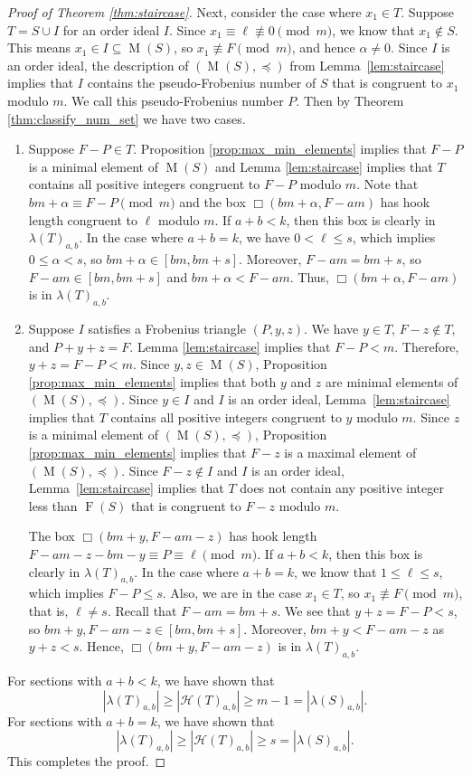 \documentclass{amsproc}
\DeclareMathOperator{\F}{F}
\DeclareMathOperator{\M}{M}
\theoremstyle{definition}
\theoremstyle{remark}
\numberwithin{equation}{section}
\begin{document}
\begin{proof}[Proof of Theorem \ref{thm:staircase}]
    Next, consider the case where $x_1\in T$. Suppose $T = S \cup I$ for an order ideal $I$. Since $x_1 \equiv \ell \not\equiv 0 \pmod{m}$, we know that $x_1\notin S$. This means
    $x_1\in I\subseteq \M(S)$, so $x_1\not\equiv F\pmod{m}$, and hence $\alpha\neq 0$.
    Since $I$ is an order ideal, the description of $(\M(S),\preccurlyeq)$ from Lemma~\ref {lem:staircase} implies that $I$ contains the pseudo-Frobenius number of $S$ that is congruent to $x_1$ modulo $m$. We call this pseudo-Frobenius number $P$.  Then by Theorem \ref{thm:classify_num_set} we have two cases.
        \begin{enumerate}[leftmargin=*]
            \item Suppose $F-P\in T$. Proposition \ref{prop:max_min_elements} implies that $F-P$ is a minimal element of $\M(S)$ and Lemma \ref{lem:staircase} implies that $T$ contains all positive integers congruent to $F-P$ modulo $m$. Note that $bm+\alpha\equiv F-P\pmod{m}$ and the box $\Box(bm+\alpha,F-am)$ has hook length congruent to $\ell$ modulo $m$. If $a+b<k$, then this box is clearly in $\lambda(T)_{a,b}$. In the case where $a+b=k$, we have $0<\ell \leq s$, which implies $0\leq \alpha< s$, so $bm+\alpha\in [bm,bm+s]$. Moreover, $F-am=bm+s$, so $F-am\in [bm,bm+s]$ and $bm+\alpha<F-am$. Thus, $\Box(bm+\alpha,F-am)$ is in $\lambda(T)_{a,b}$.
            
            \item Suppose $I$ satisfies a Frobenius triangle $(P,y,z)$. We have $y\in T$, $F-z\notin T$, and $P+y+z=F$. Lemma \ref{lem:staircase} implies that $F-P<m$. Therefore, $y+z=F-P <m$. Since $y,z\in \M(S)$, Proposition \ref{prop:max_min_elements} implies that both $y$ and $z$ are minimal elements of $(\M(S),\preccurlyeq)$. Since $y\in I$ and $I$ is an order ideal, Lemma~\ref{lem:staircase} implies that $T$ contains all positive integers congruent to $y$ modulo $m$. Since $z$ is a minimal element of $(\M(S),\preccurlyeq)$, Proposition \ref{prop:max_min_elements} implies that $F-z$ is a maximal element of $(\M(S),\preccurlyeq)$. Since $F-z\notin I$ and $I$ is an order ideal, Lemma~\ref{lem:staircase} implies that $T$ does not contain any positive integer less than $\F(S)$ that is congruent to $F-z$ modulo $m$.
            
            The box $\Box(bm+y,F-am-z)$ has hook length $F-am-z-bm-y\equiv P\equiv \ell \pmod{m}$.
            If $a+b<k$, then this box is clearly in $\lambda(T)_{a,b}$. In the case where $a+b=k$, we know that $1 \le \ell \le s$, which implies $F-P\leq s$. Also, we are in the case $x_1\in T$, so $x_1\not\equiv F\pmod{m}$, that is, $\ell \neq s$. Recall that $F-am=bm+s$. 
            We see that $y+z=F-P< s$, so $bm+y,F-am-z\in [bm,bm+s]$. Moreover, $bm+y<F-am-z$ as $y+z<s$. Hence, $\Box(bm+y,F-am-z)$ is in $\lambda(T)_{a,b}$.
        \end{enumerate}
For sections with $a+b<k$, we have shown that 
\[
|\lambda(T)_{a,b}|\geq |\mathcal{H}(T)_{a,b}|\geq m-1=|\lambda(S)_{a,b}|.
\]
For sections with $a+b=k$, we have shown that 
\[
|\lambda(T)_{a,b}|\geq |\mathcal{H}(T)_{a,b}|\geq s=|\lambda(S)_{a,b}|.
\]
This completes the proof.
\end{proof}
\end{document}
